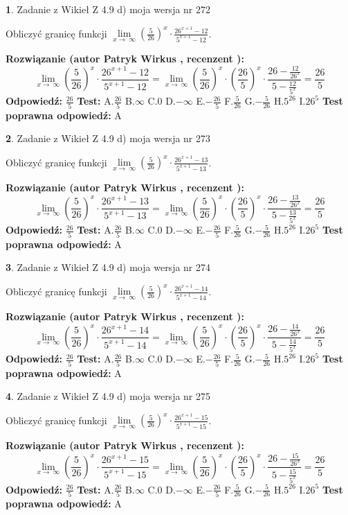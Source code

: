\documentclass[12pt, a4paper]{article}
\theoremstyle{definition} %
\newtheorem{zad}{}
\newcommand{\zadStart}[1]{\begin{zad}#1\newline}
\newcommand{\zadStop}{\end{zad}}
\newcommand{\rozwStart}[2]{\noindent \textbf{Rozwiązanie (autor #1 , recenzent #2): }\newline}
\newcommand{\rozwStop}{\newline}
\newcommand{\odpStart}{\noindent \textbf{Odpowiedź:}\newline}
\newcommand{\odpStop}{\newline}
\newcommand{\testStart}{\noindent \textbf{Test:}\newline}
\newcommand{\testStop}{\newline}
\newcommand{\kluczStart}{\noindent \textbf{Test poprawna odpowiedź:}\newline}
\newcommand{\kluczStop}{\newline}
\begin{document}
\zadStart{Zadanie z Wikieł Z 4.9 d) moja wersja nr 272}


Obliczyć granicę funkcji  $\lim\limits_{x\to\ \infty}(\frac{5}{26})^{x}\cdot\frac{26^{x+1}-12}{5^{x+1}-12}$.
\zadStop
\rozwStart{Patryk Wirkus}{}
$$\lim\limits_{x\to\ \infty}(\frac{5}{26})^{x}\cdot\frac{26^{x+1}-12}{5^{x+1}-12}=\lim\limits_{x\to\ \infty}(\frac{5}{26})^{x}\cdot(\frac{26}{5})^{x} \cdot \frac{26-\frac{12}{26^{x}}}{5-\frac{12}{5^{x}}} = \frac{26}{5}$$
\rozwStop
\odpStart
$\frac{26}{5}$
\odpStop
\testStart
A.$\frac{26}{5}$ B.$\infty$ C.$0$ D.$-\infty$ E.$-\frac{26}{5}$
F.$\frac{5}{26}$ G.$-\frac{5}{26}$
H.$5^{26}$
I.$26^{5}$
\testStop
\kluczStart
A
\kluczStop



\zadStart{Zadanie z Wikieł Z 4.9 d) moja wersja nr 273}


Obliczyć granicę funkcji  $\lim\limits_{x\to\ \infty}(\frac{5}{26})^{x}\cdot\frac{26^{x+1}-13}{5^{x+1}-13}$.
\zadStop
\rozwStart{Patryk Wirkus}{}
$$\lim\limits_{x\to\ \infty}(\frac{5}{26})^{x}\cdot\frac{26^{x+1}-13}{5^{x+1}-13}=\lim\limits_{x\to\ \infty}(\frac{5}{26})^{x}\cdot(\frac{26}{5})^{x} \cdot \frac{26-\frac{13}{26^{x}}}{5-\frac{13}{5^{x}}} = \frac{26}{5}$$
\rozwStop
\odpStart
$\frac{26}{5}$
\odpStop
\testStart
A.$\frac{26}{5}$ B.$\infty$ C.$0$ D.$-\infty$ E.$-\frac{26}{5}$
F.$\frac{5}{26}$ G.$-\frac{5}{26}$
H.$5^{26}$
I.$26^{5}$
\testStop
\kluczStart
A
\kluczStop



\zadStart{Zadanie z Wikieł Z 4.9 d) moja wersja nr 274}


Obliczyć granicę funkcji  $\lim\limits_{x\to\ \infty}(\frac{5}{26})^{x}\cdot\frac{26^{x+1}-14}{5^{x+1}-14}$.
\zadStop
\rozwStart{Patryk Wirkus}{}
$$\lim\limits_{x\to\ \infty}(\frac{5}{26})^{x}\cdot\frac{26^{x+1}-14}{5^{x+1}-14}=\lim\limits_{x\to\ \infty}(\frac{5}{26})^{x}\cdot(\frac{26}{5})^{x} \cdot \frac{26-\frac{14}{26^{x}}}{5-\frac{14}{5^{x}}} = \frac{26}{5}$$
\rozwStop
\odpStart
$\frac{26}{5}$
\odpStop
\testStart
A.$\frac{26}{5}$ B.$\infty$ C.$0$ D.$-\infty$ E.$-\frac{26}{5}$
F.$\frac{5}{26}$ G.$-\frac{5}{26}$
H.$5^{26}$
I.$26^{5}$
\testStop
\kluczStart
A
\kluczStop



\zadStart{Zadanie z Wikieł Z 4.9 d) moja wersja nr 275}


Obliczyć granicę funkcji  $\lim\limits_{x\to\ \infty}(\frac{5}{26})^{x}\cdot\frac{26^{x+1}-15}{5^{x+1}-15}$.
\zadStop
\rozwStart{Patryk Wirkus}{}
$$\lim\limits_{x\to\ \infty}(\frac{5}{26})^{x}\cdot\frac{26^{x+1}-15}{5^{x+1}-15}=\lim\limits_{x\to\ \infty}(\frac{5}{26})^{x}\cdot(\frac{26}{5})^{x} \cdot \frac{26-\frac{15}{26^{x}}}{5-\frac{15}{5^{x}}} = \frac{26}{5}$$
\rozwStop
\odpStart
$\frac{26}{5}$
\odpStop
\testStart
A.$\frac{26}{5}$ B.$\infty$ C.$0$ D.$-\infty$ E.$-\frac{26}{5}$
F.$\frac{5}{26}$ G.$-\frac{5}{26}$
H.$5^{26}$
I.$26^{5}$
\testStop
\kluczStart
A
\kluczStop
\end{document}
